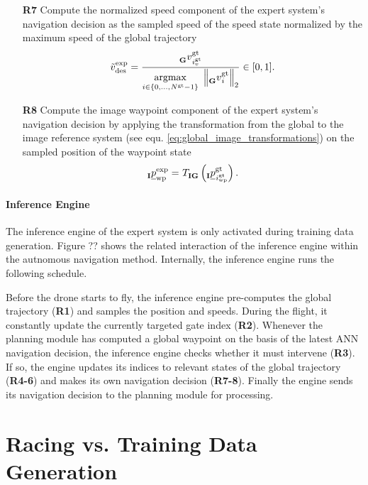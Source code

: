 \begin{itemize}
    


    \item [\textbf{R7}] Compute the normalized speed component
    of the expert system's navigation decision
    as the sampled speed of the speed state
    normalized by the maximum speed of the global trajectory
    \begin{equation}
        \speed[\norm]{\expert}{\desired}{}{}
        = 
        \frac{
            \speed[]{\glotraj}{\idx[]{\glotraj}{v}{}{}}{\grs}{}
        }
        {
            \argmax{i \in \{0, ..., \num[]{\glotraj}{}{}{} - 1\}}
            \left\| 
                \speed[]{\glotraj}{\idx[]{}{}{}{}}{\grs}{}
            \right\|_2
        }  
        \in [0,1].
    \end{equation}


    
    
    
    \item [\textbf{R8}] Compute the image waypoint component
    of the expert system's navigation decision
    by applying the transformation
    from the global to the image reference system (see equ. \ref{eq:global_image_transformations})
    on the sampled position of the waypoint state 
    \begin{equation}
        \pos[]{\expert}{\wayp}{\irs}{}
        =
        \trafo[]{}{\irs\grs}{}{} \left(
            \pos[]{\glotraj}{\idx[]{\glotraj}{\wayp}{}{}}{\irs}{}
        \right)
        .
    \end{equation}

\end{itemize}





\paragraph*{Inference Engine} $\ $\\
The inference engine of the expert system is only activated 
during training data generation.
Figure ?? shows the related interaction of the inference engine 
within the autnomous navigation method.
Internally, the inference engine runs the following schedule.

Before the drone starts to fly,
the inference engine pre-computes the global trajectory (\textbf{R1})
and samples the position and speeds.
During the flight, it constantly update the currently targeted
gate index (\textbf{R2}).
Whenever the planning module has computed a global waypoint on the basis
of the latest ANN navigation decision,
the inference engine checks whether it must intervene (\textbf{R3}).
If so, the engine updates its indices to relevant states of the global trajectory
(\textbf{R4-6})
and makes its own navigation decision (\textbf{R7-8}).
Finally the engine sends its navigation decision to the planning module for processing.

\section{Racing vs. Training Data Generation}





